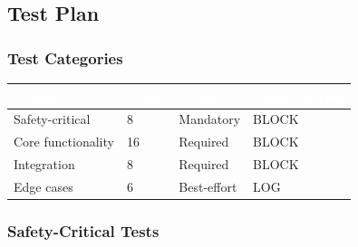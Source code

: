 \documentclass[11pt,letterpaper]{article}
\newcommand{\tableheader}[1]{\textbf{\sffamily\textcolor{white}{#1}}}
\begin{document}
\subsection{Test Plan}

\subsubsection{Test Categories}

\begin{center}
\begin{tabularx}{\textwidth}{L{3cm}C{1.5cm}C{1.5cm}C{2cm}}
\toprule
{}
\tableheader{Category} & \tableheader{Count} & \tableheader{Priority} & \tableheader{Failure Action} \\
\midrule
Safety-critical & 8 & Mandatory & BLOCK \\
Core functionality & 16 & Required & BLOCK \\
Integration & 8 & Required & BLOCK \\
Edge cases & 6 & Best-effort & LOG \\
\bottomrule
\end{tabularx}
\end{center}

\subsubsection{Safety-Critical Tests}
\end{document}
